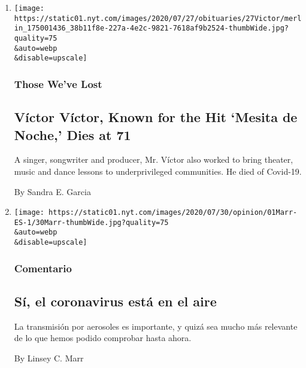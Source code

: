 \begin{enumerate}
\def\labelenumi{\arabic{enumi}.}
\item
  \href{/2020/08/01/obituaries/victor-victor-dead-coronavirus.html}{}

  \texttt{[image: https://static01.nyt.com/images/2020/07/27/obituaries/27Victor/merlin\_175001436\_38b11f8e-227a-4e2c-9821-7618af9b2524-thumbWide.jpg?quality=75\\\&auto=webp\\\&disable=upscale]}

  \hypertarget{those-weve-lost}{%
  \subsubsection{Those We've Lost}\label{those-weve-lost}}

  \hypertarget{vuxedctor-vuxedctor-known-for-the-hit-mesita-de-noche-dies-at-71}{%
  \subsection{Víctor Víctor, Known for the Hit `Mesita de Noche,' Dies
  at
  71}\label{vuxedctor-vuxedctor-known-for-the-hit-mesita-de-noche-dies-at-71}}

  A singer, songwriter and producer, Mr. Víctor also worked to bring
  theater, music and dance lessons to underprivileged communities. He
  died of Covid-19.

  By Sandra E. Garcia
\item
  \href{/es/2020/08/01/espanol/opinion/coronavirus-aire.html}{}

  \texttt{[image: https://static01.nyt.com/images/2020/07/30/opinion/01Marr-ES-1/30Marr-thumbWide.jpg?quality=75\\\&auto=webp\\\&disable=upscale]}

  \hypertarget{comentario}{%
  \subsubsection{Comentario}\label{comentario}}

  \hypertarget{suxed-el-coronavirus-estuxe1-en-el-aire}{%
  \subsection{Sí, el coronavirus está en el
  aire}\label{suxed-el-coronavirus-estuxe1-en-el-aire}}

  La transmisión por aerosoles es importante, y quizá sea mucho más
  relevante de lo que hemos podido comprobar hasta ahora.

  By Linsey C. Marr


\end{enumerate}
